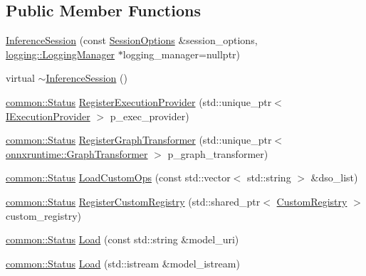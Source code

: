 \subsection*{Public Member Functions}
\begin{DoxyCompactItemize}
\item 
\mbox{\hyperlink{classonnxruntime_1_1InferenceSession_ae17b4c203f1a897ba86b7858d6984156}{Inference\+Session}} (const \mbox{\hyperlink{structonnxruntime_1_1SessionOptions}{Session\+Options}} \&session\+\_\+options, \mbox{\hyperlink{classonnxruntime_1_1logging_1_1LoggingManager}{logging\+::\+Logging\+Manager}} $\ast$logging\+\_\+manager=nullptr)
\item 
virtual \mbox{\hyperlink{classonnxruntime_1_1InferenceSession_ac65abf4735716f82dd91a6dc3ad0000e}{$\sim$\+Inference\+Session}} ()
\item 
\mbox{\hyperlink{classonnxruntime_1_1common_1_1Status}{common\+::\+Status}} \mbox{\hyperlink{classonnxruntime_1_1InferenceSession_a85f935178f4bcd8de35e36a2a9e84669}{Register\+Execution\+Provider}} (std\+::unique\+\_\+ptr$<$ \mbox{\hyperlink{classonnxruntime_1_1IExecutionProvider}{I\+Execution\+Provider}} $>$ p\+\_\+exec\+\_\+provider)
\item 
\mbox{\hyperlink{classonnxruntime_1_1common_1_1Status}{common\+::\+Status}} \mbox{\hyperlink{classonnxruntime_1_1InferenceSession_a0aa67768d7e26977dae70be76a3f8200}{Register\+Graph\+Transformer}} (std\+::unique\+\_\+ptr$<$ \mbox{\hyperlink{classonnxruntime_1_1GraphTransformer}{onnxruntime\+::\+Graph\+Transformer}} $>$ p\+\_\+graph\+\_\+transformer)
\item 
\mbox{\hyperlink{classonnxruntime_1_1common_1_1Status}{common\+::\+Status}} \mbox{\hyperlink{classonnxruntime_1_1InferenceSession_a038b1a768eb597f03959867f3aa23bff}{Load\+Custom\+Ops}} (const std\+::vector$<$ std\+::string $>$ \&dso\+\_\+list)
\item 
\mbox{\hyperlink{classonnxruntime_1_1common_1_1Status}{common\+::\+Status}} \mbox{\hyperlink{classonnxruntime_1_1InferenceSession_a4118c53534b5927473a86f0c1323cf6c}{Register\+Custom\+Registry}} (std\+::shared\+\_\+ptr$<$ \mbox{\hyperlink{classonnxruntime_1_1CustomRegistry}{Custom\+Registry}} $>$ custom\+\_\+registry)
\item 
\mbox{\hyperlink{classonnxruntime_1_1common_1_1Status}{common\+::\+Status}} \mbox{\hyperlink{classonnxruntime_1_1InferenceSession_a2cba03dfe0b8399e2d366bdcef2c9dc9}{Load}} (const std\+::string \&model\+\_\+uri)
\item 
\mbox{\hyperlink{classonnxruntime_1_1common_1_1Status}{common\+::\+Status}} \mbox{\hyperlink{classonnxruntime_1_1InferenceSession_adc261dabbe5b1e346736b35394272081}{Load}} (std\+::istream \&model\+\_\+istream)

\end{DoxyCompactItemize}
